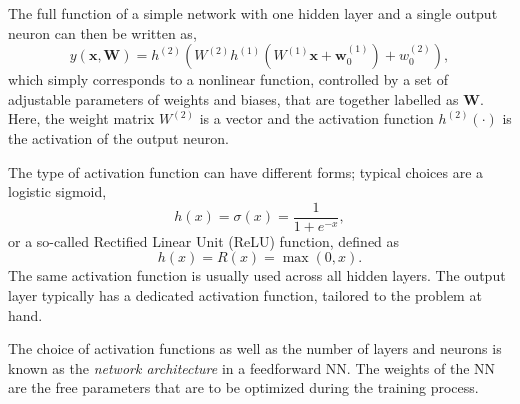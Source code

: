 The full function of a simple network with one hidden layer and a single output neuron can then be written as,
\begin{equation}
    y(\mathbf{x}, \mathbf{W}) = h^{(2)} \left( W^{(2)} h^{(1)} \left(  W^{(1)} \mathbf{x} + \mathbf{w}^{(1)}_{0}    \right) + w^{(2)}_{0} \right),
\end{equation}
which simply corresponds to a nonlinear function, controlled by a set of adjustable parameters of weights and biases, that are together labelled as $\mathbf{W}$. Here, the weight matrix $W^{(2)}$ is a vector and the activation function $h^{(2)}(\cdot)$ is the activation of the output neuron.

The type of activation function can have different forms; typical choices are a logistic sigmoid,
\begin{equation}
    \label{eq:logistic-sigmoid}
    h(x)= \sigma(x) = {\frac {1}{1+e^{-x}}},
\end{equation}
or a so-called Rectified Linear Unit (ReLU) function, defined as
\begin{equation}
    {h(x)= R(x) = \max(0,x)}.    
\end{equation}
The same activation function is usually used across all hidden layers.
The output layer typically has a dedicated activation function, tailored to the problem at hand.

The choice of activation functions as well as the number of layers and neurons is known as the \emph{network architecture} in a feedforward NN. The weights of the NN are the free parameters that are to be optimized during the training process.





